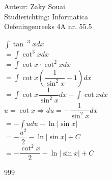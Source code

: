 \documentclass[a4paper]{article}
\begin{document}
  
\noindent \large Auteur: Zaky Souai \\
\noindent \large Studierichting:  Informatica\\
\noindent \large Oefeningenreeks 4A nr. 55.5\\

\bigskip

\normalsize

$\displaystyle \int \tan^{-3} x dx$\\

$= \displaystyle \int \cot^3 x dx$\\

$= \displaystyle \int \cot x \cdot \cot^2 x dx$\\

$= \displaystyle \int \cot x \left( \dfrac{1}{\sin^2 x} - 1 \right) dx$\\

$= \displaystyle \int \cot x \dfrac{1}{\sin^2 x} dx - \displaystyle \int \cot x dx$\\

$u = \cot x\Rightarrow du = -\dfrac{1}{\sin^2 x}dx$\\

$= - \displaystyle \int u du - \ln |\sin x|$\\

$= - \dfrac{u^2}{2} - \ln |\sin x| + C$\\

$= - \dfrac{\cot^2 x}{2} - \ln |\sin x| + C$

\begin{thebibliography}{999}
\end{thebibliography}
\end{document}
